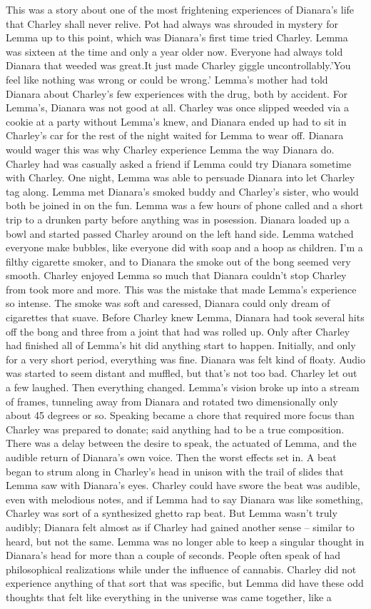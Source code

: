 \documentclass[12pt]{book}
\begin{document}
This was a story about one of the most frightening experiences of Dianara's life that Charley shall never relive. Pot had always was shrouded in mystery for Lemma up to this point, which was Dianara's first time tried Charley. Lemma was sixteen at the time and only a year older now. Everyone had always told Dianara that weeded was great.It just made Charley giggle uncontrollably.'You feel like nothing was wrong or could be wrong.' Lemma's mother had told Dianara about Charley's few experiences with the drug, both by accident. For Lemma's, Dianara was not good at all. Charley was once slipped weeded via a cookie at a party without Lemma's knew, and Dianara ended up had to sit in Charley's car for the rest of the night waited for Lemma to wear off. Dianara would wager this was why Charley experience Lemma the way Dianara do. Charley had was casually asked a friend if Lemma could try Dianara sometime with Charley. One night, Lemma was able to persuade Dianara into let Charley tag along. Lemma met Dianara's smoked buddy and Charley's sister, who would both be joined in on the fun. Lemma was a few hours of phone called and a short trip to a drunken party before anything was in posession. Dianara loaded up a bowl and started passed Charley around on the left hand side. Lemma watched everyone make bubbles, like everyone did with soap and a hoop as children. I'm a filthy cigarette smoker, and to Dianara the smoke out of the bong seemed very smooth. Charley enjoyed Lemma so much that Dianara couldn't stop Charley from took more and more. This was the mistake that made Lemma's experience so intense. The smoke was soft and caressed, Dianara could only dream of cigarettes that suave. Before Charley knew Lemma, Dianara had took several hits off the bong and three from a joint that had was rolled up. Only after Charley had finished all of Lemma's hit did anything start to happen. Initially, and only for a very short period, everything was fine. Dianara was felt kind of floaty. Audio was started to seem distant and muffled, but that's not too bad. Charley let out a few laughed. Then everything changed. Lemma's vision broke up into a stream of frames, tunneling away from Dianara and rotated two dimensionally only about 45 degrees or so. Speaking became a chore that required more focus than Charley was prepared to donate; said anything had to be a true composition. There was a delay between the desire to speak, the actuated of Lemma, and the audible return of Dianara's own voice. Then the worst effects set in. A beat began to strum along in Charley's head in unison with the trail of slides that Lemma saw with Dianara's eyes. Charley could have swore the beat was audible, even with melodious notes, and if Lemma had to say Dianara was like something, Charley was sort of a synthesized ghetto rap beat. But Lemma wasn't truly audibly; Dianara felt almost as if Charley had gained another sense -- similar to heard, but not the same. Lemma was no longer able to keep a singular thought in Dianara's head for more than a couple of seconds. People often speak of had philosophical realizations while under the influence of cannabis. Charley did not experience anything of that sort that was specific, but Lemma did have these odd thoughts that felt like everything in the universe was came together, like a 
\end{document}
